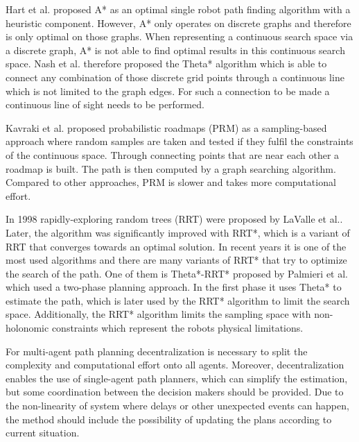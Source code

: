 \documentclass[journal]{IEEEtran}
\begin{document}
Hart et al.\cite{AStar} proposed A* as an optimal single robot path finding algorithm with a heuristic component. However, A* only operates on discrete graphs and therefore is only optimal on those graphs. When representing a continuous search space via a discrete graph, A* is not able to find optimal results in this continuous search space. Nash et al.\cite{ThetaStar} therefore proposed the Theta* algorithm which is able to connect any combination of those discrete grid points through a continuous line which is not limited to the graph edges. For such a connection to be made a continuous line of sight needs to be performed.

Kavraki et al. \cite{Roadmaps} proposed probabilistic roadmaps (PRM) as a sampling-based approach where random samples are taken and tested if they fulfil the constraints of the continuous space. Through connecting points that are near each other a roadmap is built. The path is then computed by a graph searching algorithm. Compared to other approaches, PRM is slower and takes more computational effort.

In 1998 rapidly-exploring random trees (RRT) were proposed by LaValle et al.\cite{RRT}. Later, the algorithm was significantly improved with RRT*\cite{RRTStar}, which is a variant of RRT that converges towards an optimal solution. In recent years it is one of the most used algorithms and there are many variants of RRT* that try to optimize the search of the path. One of them is Theta*-RRT* proposed by Palmieri et al.\cite{ThetaStarRRTStar} which used a two-phase planning approach. In the first phase it uses Theta* to estimate the path, which is later used by the RRT* algorithm to limit the search space. Additionally, the RRT* algorithm limits the sampling space with non-holonomic constraints which represent the robots physical limitations.

For multi-agent path planning decentralization is necessary to split the complexity and computational effort onto all agents. Moreover, decentralization enables the use of single-agent path planners, which can simplify the estimation, but some coordination between the decision makers should be provided. Due to the non-linearity of system where delays or other unexpected events can happen, the method should include the possibility of updating the plans according to current situation.
\end{document}
